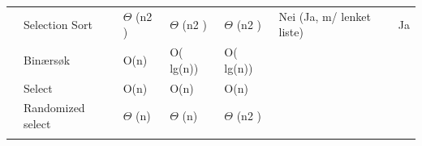 \documentclass[12pt]{report}
\begin{document}
\begin{table}[H]
\begin{tabular}{p{0.56in}p{1.29in}p{0.7in}p{0.7in}p{0.7in}p{0.56in}p{0.55in}}
\hhline{~~~~~~~}
\multicolumn{1}{p{0.56in}}{} & 
\multicolumn{1}{p{1.29in}}{{\fontsize{10pt}{12.0pt}\selectfont Selection Sort}} & 
\multicolumn{1}{p{0.7in}}{{\fontsize{10pt}{12.0pt}\selectfont $ \Theta $ (n2 )}} & 
\multicolumn{1}{p{0.7in}}{{\fontsize{10pt}{12.0pt}\selectfont $ \Theta $ (n2 )}} & 
\multicolumn{1}{p{0.7in}}{{\fontsize{10pt}{12.0pt}\selectfont $ \Theta $ (n2 )}} & 
\multicolumn{1}{p{0.56in}}{{\fontsize{10pt}{12.0pt}\selectfont Nei (Ja, m/ lenket liste)}} & 
\multicolumn{1}{p{0.55in}}{{\fontsize{10pt}{12.0pt}\selectfont Ja}} \\
\hhline{~~~~~~~}
\multicolumn{1}{p{0.56in}}{} & 
\multicolumn{1}{p{1.29in}}{{\fontsize{10pt}{12.0pt}\selectfont Binærsøk}} & 
\multicolumn{1}{p{0.7in}}{{\fontsize{10pt}{12.0pt}\selectfont O(n)}} & 
\multicolumn{1}{p{0.7in}}{{\fontsize{10pt}{12.0pt}\selectfont O( lg(n))}} & 
\multicolumn{1}{p{0.7in}}{{\fontsize{10pt}{12.0pt}\selectfont O( lg(n))}} & 
\multicolumn{1}{p{0.56in}}{\Centering {\fontsize{10pt}{12.0pt}\selectfont -}} & 
\multicolumn{1}{p{0.55in}}{\Centering {\fontsize{10pt}{12.0pt}\selectfont -}} \\
\hhline{~~~~~~~}
\multicolumn{1}{p{0.56in}}{{\fontsize{10pt}{12.0pt}\selectfont Søk}} & 
\multicolumn{1}{p{1.29in}}{{\fontsize{10pt}{12.0pt}\selectfont Select}} & 
\multicolumn{1}{p{0.7in}}{{\fontsize{10pt}{12.0pt}\selectfont O(n)}} & 
\multicolumn{1}{p{0.7in}}{{\fontsize{10pt}{12.0pt}\selectfont O(n)}} & 
\multicolumn{1}{p{0.7in}}{{\fontsize{10pt}{12.0pt}\selectfont O(n)}} & 
\multicolumn{1}{p{0.56in}}{\Centering {\fontsize{10pt}{12.0pt}\selectfont -}} & 
\multicolumn{1}{p{0.55in}}{\Centering {\fontsize{10pt}{12.0pt}\selectfont -}} \\
\hhline{~~~~~~~}
\multicolumn{1}{p{0.56in}}{} & 
\multicolumn{1}{p{1.29in}}{{\fontsize{10pt}{12.0pt}\selectfont Randomized select}} & 
\multicolumn{1}{p{0.7in}}{{\fontsize{10pt}{12.0pt}\selectfont $ \Theta $ (n)}} & 
\multicolumn{1}{p{0.7in}}{{\fontsize{10pt}{12.0pt}\selectfont $ \Theta $ (n)}} & 
\multicolumn{1}{p{0.7in}}{{\fontsize{10pt}{12.0pt}\selectfont $ \Theta $ (n2 )}} & 
\multicolumn{1}{p{0.56in}}{\Centering {\fontsize{10pt}{12.0pt}\selectfont -}} & 
\multicolumn{1}{p{0.55in}}{\Centering {\fontsize{10pt}{12.0pt}\selectfont -}} \\
\hhline{~~~~~~~}

\end{tabular}
 \end{table}


\end{document}
